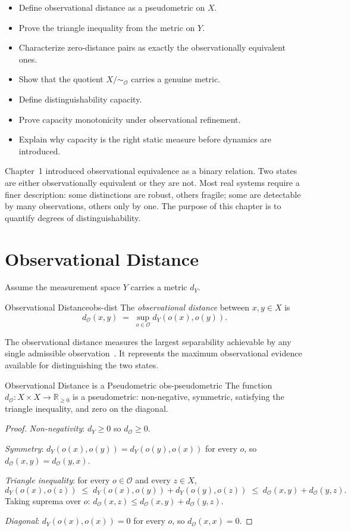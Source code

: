 \documentclass[12pt,twoside,openright]{book}
\newcommand{\obs}{\mathcal{O}}
\newcommand{\distMetric}{d_{\mathcal{O}}}
\newenvironment{objectives}{%
  \begin{tcolorbox}[colback=DistBlue!5,colframe=DistBlue,
    title={\faCheckCircle\enspace Chapter Objectives},
    fonttitle=\sffamily\bfseries\color{white},
    attach boxed title to top left={yshift=-2mm,xshift=4mm},
    boxed title style={colback=DistBlue},breakable]
  \begin{itemize}[leftmargin=*,nosep]}{%
  \end{itemize}\end{tcolorbox}\vspace{1em}}
\providecommand{\quotientObs}{X/{\sim_{\obs}}}
\begin{document}
\begin{objectives}
\item Define observational distance as a pseudometric on $X$.
\item Prove the triangle inequality from the metric on $Y$.
\item Characterize zero-distance pairs as exactly the
  observationally equivalent ones.
\item Show that the quotient $\quotientObs$ carries a genuine
  metric.
\item Define distinguishability capacity.
\item Prove capacity monotonicity under observational refinement.
\item Explain why capacity is the right static measure before
  dynamics are introduced.
\end{objectives}

Chapter~1 introduced observational equivalence as a binary
relation. Two states are either observationally equivalent or
they are not. Most real systems require a finer description:
some distinctions are robust, others fragile; some are
detectable by many observations, others only by one. The
purpose of this chapter is to quantify degrees of
distinguishability.

\section{Observational Distance}

Assume the measurement space $Y$ carries a metric $d_Y$.

\begin{definition}{Observational Distance}{obs-dist}
The \emph{observational distance} between $x,y\in X$ is
\[
  \distMetric(x,y)
  \;=\;
  \sup_{o\in\obs} d_Y(o(x),o(y)).
\]
\end{definition}

The observational distance measures the largest separability
achievable by any single admissible observation~\cite{shannon1948}. It represents
the maximum observational evidence available for distinguishing
the two states.

\begin{theorem}{Observational Distance is a Pseudometric}%
  {obs-pseudometric}
The function $\distMetric:X\times X\to\mathbb{R}_{\ge0}$ is a
pseudometric: non-negative, symmetric, satisfying the triangle
inequality, and zero on the diagonal.
\begin{proof}
\emph{Non-negativity}: $d_Y\ge 0$ so $\distMetric\ge 0$.

\emph{Symmetry}: $d_Y(o(x),o(y))=d_Y(o(y),o(x))$ for every
$o$, so $\distMetric(x,y)=\distMetric(y,x)$.

\emph{Triangle inequality}: for every $o\in\obs$ and every
$z\in X$,
\[
  d_Y(o(x),o(z))
  \;\le\;
  d_Y(o(x),o(y)) + d_Y(o(y),o(z))
  \;\le\;
  \distMetric(x,y) + \distMetric(y,z).
\]
Taking suprema over $o$:
$\distMetric(x,z)\le\distMetric(x,y)+\distMetric(y,z)$.

\emph{Diagonal}: $d_Y(o(x),o(x))=0$ for every $o$, so
$\distMetric(x,x)=0$.
\end{proof}
\end{theorem}
\end{document}
